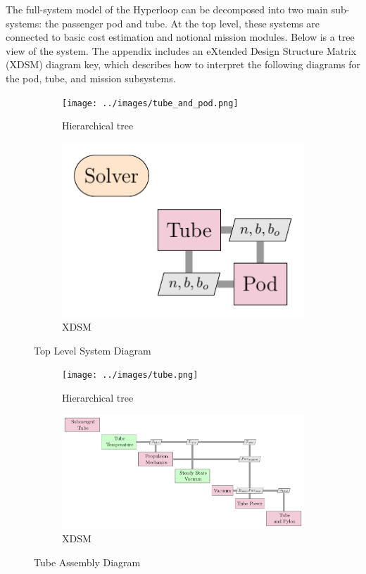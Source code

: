 The full-system model of the Hyperloop can be decomposed into two main
sub-systems: the passenger pod and tube. At the top level, these systems are
connected to basic cost estimation and notional
mission modules. Below is a tree view of the system.
The appendix includes an eXtended Design Structure Matrix (XDSM) diagram key,
which describes how to interpret the following diagrams for the pod, tube, and mission subsystems.

\begin{figure}
\centering
\begin{subfigure}{.5\textwidth}
  \centering
  \texttt{[image: ../images/tube\_and\_pod.png]}
  \caption{Hierarchical tree}
  \label{fig:tree:tube_and_pod}
\end{subfigure}%
\begin{subfigure}{.5\textwidth}
  \centering
  \includegraphics{../images/xdsm/tube_and_pod.pdf}
  \caption{XDSM}
  \label{fig:xdsm:toplevel}
\end{subfigure}
\caption{Top Level System Diagram}
\label{fig:top}
\end{figure}

\begin{figure}
\centering
\begin{subfigure}{.5\textwidth}
  \centering
  \texttt{[image: ../images/tube.png]}
  \caption{Hierarchical tree}
  \label{fig:tree:tube}
\end{subfigure}%
\begin{subfigure}{.5\textwidth}
  \centering
  \includegraphics{../images/xdsm/tube.pdf}
  \caption{XDSM}
  \label{fig:xdsm:tube}
\end{subfigure}
\caption{Tube Assembly Diagram}
\label{fig:tube}
\end{figure}

